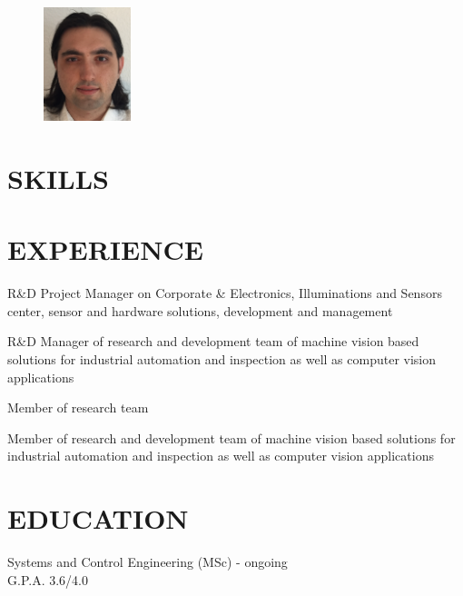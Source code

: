 \documentclass[margin]{res}
\begin{document}
	\begin{resume}
		\begin{figure}
			\vspace{-1in}
			\includegraphics[width=1in]{me.jpg}
		\end{figure}
		
		\vspace{.5in}
		\section{SKILLS}
		
		\vspace{.5in}

		\section{EXPERIENCE}
		{R\&D Project Manager on Corporate \& Electronics, Illuminations and Sensors center, sensor and hardware solutions, development and management}
		
		{R\&D Manager of research and development team of machine vision based solutions for industrial automation and inspection as well as computer vision applications}
		
		{Member of research team}
		
		{Member of research and development team of machine vision based solutions for industrial automation and inspection as well as computer vision applications}
		
		\vspace{.5in}
		\section{EDUCATION}
		{Systems and Control Engineering (MSc) - ongoing\\G.P.A. 3.6/4.0}


\end{resume}
\end{document}
